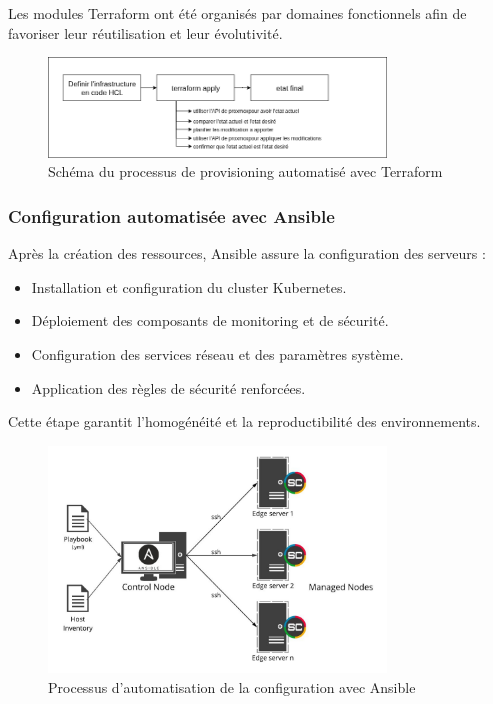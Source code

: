 Les modules Terraform ont été organisés par domaines fonctionnels afin de favoriser leur réutilisation et leur évolutivité.

\begin{figure}[H]
	\centering
	\includegraphics[width=0.8\textwidth]{figures/terraform-provisioning.png}
	\caption{Schéma du processus de provisioning automatisé avec Terraform}
\end{figure}

\subsubsection*{Configuration automatisée avec Ansible}

Après la création des ressources, Ansible assure la configuration des serveurs :
\begin{itemize}
	\item Installation et configuration du cluster Kubernetes.
	\item Déploiement des composants de monitoring et de sécurité.
	\item Configuration des services réseau et des paramètres système.
	\item Application des règles de sécurité renforcées.
\end{itemize}

Cette étape garantit l’homogénéité et la reproductibilité des environnements.

\begin{figure}[H]
	\centering
	\includegraphics[width=0.8\textwidth]{figures/ansible-configuration.png}
	\caption{Processus d'automatisation de la configuration avec Ansible}
\end{figure}

